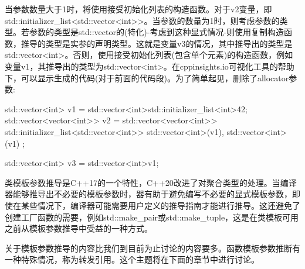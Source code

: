 当参数数量大于1时，将使用接受初始化列表的构造函数。对于v2变量，即std::initializer\_list<std::vector<int>{}>。当参数的数量为1时，则考虑参数的类型。若参数的类型是std::vector的(特化)-考虑到这种显式情况-则使用复制构造函数，推导的类型是实参的声明类型。这就是变量v3的情况，其中推导出的类型是std::vector<int>。否则，使用接受初始化列表(包含单个元素)的构造函数，例如变量v1，其推导出的类型为std::vector<int>。在cppinsights.io可视化工具的帮助下，可以显示生成的代码(对于前面的代码段)。为了简单起见，删除了allocator参数:

\begin{cpp}
std::vector<int> v1 =
std::vector<int>{std::initializer_list<int>{42}};
std::vector<vector<int>> v2 =
std::vector<vector<int>>{
	std::initializer_list<std::vector<int>>{
		std::vector<int>(v1),
			std::vector<int>(v1)
		}
	};

std::vector<int> v3 = std::vector<int>{v1};
\end{cpp}

类模板参数推导是C++17的一个特性，C++20改进了对聚合类型的处理。当编译器能够推导出不必要的模板参数时，器有助于避免编写不必要的显式模板参数，即使在某些情况下，编译器可能需要用户定义的推导指南才能进行推导。这还避免了创建工厂函数的需要，例如std::make\_pair或std::make\_tuple，这是在类模板可用之前从模板参数推导中受益的一种方式。

关于模板参数推导的内容比我们到目前为止讨论的内容要多。函数模板参数推断有一种特殊情况，称为转发引用。这个主题将在下面的章节中进行讨论。







